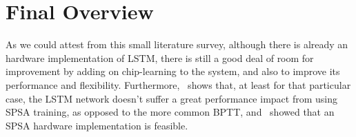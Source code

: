 \section{Final Overview}\label{sec:overview}
As we could attest from this small literature survey, although there is already an hardware implementation of LSTM, there is still a good deal
of room for improvement by adding on chip-learning to the system, and also to improve its performance and flexibility.
Furthermore,~\cite{Tavear13} shows that, at least for that particular case, the LSTM network doesn't suffer a great performance impact from
using SPSA training, as opposed to the more common BPTT, and~\cite{Maeda05} showed that an
SPSA hardware implementation is feasible.
